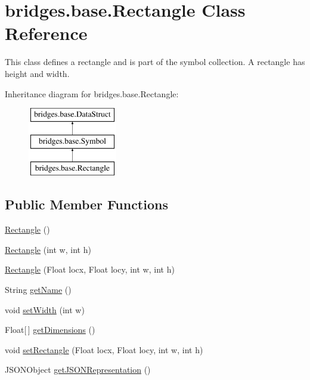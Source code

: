 \hypertarget{classbridges_1_1base_1_1_rectangle}{}\section{bridges.\+base.\+Rectangle Class Reference}
\label{classbridges_1_1base_1_1_rectangle}


This class defines a rectangle and is part of the symbol collection. A rectangle has height and width.  


Inheritance diagram for bridges.\+base.\+Rectangle\+:\begin{figure}[H]
\begin{center}
\leavevmode
\includegraphics[height=3.000000cm]{classbridges_1_1base_1_1_rectangle}
\end{center}
\end{figure}
\subsection*{Public Member Functions}
\begin{DoxyCompactItemize}
\item 
\hyperlink{classbridges_1_1base_1_1_rectangle_a6d80c63a14e9b94df552dac422348dc3}{Rectangle} ()
\item 
\hyperlink{classbridges_1_1base_1_1_rectangle_a8e7e936bf76b597c097a9786cf02cf77}{Rectangle} (int w, int h)
\item 
\hyperlink{classbridges_1_1base_1_1_rectangle_ade3310629f09ee38c57853108d387628}{Rectangle} (Float locx, Float locy, int w, int h)
\item 
String \hyperlink{classbridges_1_1base_1_1_rectangle_ab785b45f264ae3cd61a5a898ffa6afba}{get\+Name} ()
\item 
void \hyperlink{classbridges_1_1base_1_1_rectangle_a803ca26bb6bb0c29c9316d910fce0fe1}{set\+Width} (int w)
\item 
Float\mbox{[}$\,$\mbox{]} \hyperlink{classbridges_1_1base_1_1_rectangle_a9a903d4617cde354f617ac4e8625fa38}{get\+Dimensions} ()
\item 
void \hyperlink{classbridges_1_1base_1_1_rectangle_a7f071805534af749355f3d6122972ab9}{set\+Rectangle} (Float locx, Float locy, int w, int h)
\item 
J\+S\+O\+N\+Object \hyperlink{classbridges_1_1base_1_1_rectangle_ad9a44cbdc301594b8708769461ad4461}{get\+J\+S\+O\+N\+Representation} ()
\end{DoxyCompactItemize}

